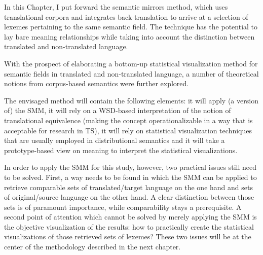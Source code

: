 In this Chapter, I put forward the semantic mirrors method, which uses translational corpora and integrates back-translation to arrive at a selection of lexemes pertaining to the same semantic field. The technique has the potential to lay bare meaning relationships while taking into account the distinction between translated and non-translated language.

With the prospect of elaborating a bottom-up statistical visualization method for semantic fields in translated and non-translated language, a number of theoretical notions from corpus-based semantics were further explored.

The envisaged method will contain the following elements: it will apply (a version of) the SMM, it will rely on a WSD-based interpretation of the notion of translational equivalence (making the concept operationalizable in a way that is acceptable for research in TS), it will rely on statistical visualization techniques that are usually employed in distributional semantics and it will take a prototype-based view on meaning to interpret the statistical visualizations.

In order to apply the SMM for this study, however, two practical issues still need to be solved. First, a way needs to be found in which the SMM can be applied to retrieve comparable sets of translated/target language on the one hand and sets of original/source language on the other hand. A clear distinction between those sets is of paramount importance, while comparability stays a prerequisite. A second point of attention which cannot be solved by merely applying the SMM is the objective visualization of the results: how to practically create the statistical visualizations of those retrieved sets of lexemes? These two issues will be at the center of the methodology described in the next chapter.
